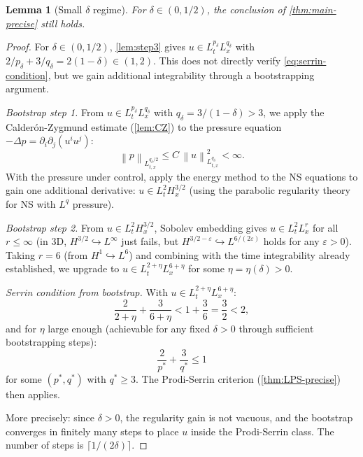 \documentclass[12pt]{article}
\theoremstyle{plain}
\newtheorem{lemma}[theorem]{Lemma}
\theoremstyle{definition}
\theoremstyle{remark}
\newcommand{\norm}[1]{\left\|#1\right\|}
\newcommand{\pa}{\partial}
\newcommand{\eps}{\varepsilon}
\newcommand{\lap}{\Delta}
\begin{document}
\begin{lemma}[Small $\delta$ regime]\label{lem:small-delta}
  For $\delta\in(0,1/2)$, the conclusion of \cref{thm:main-precise} still holds.
\end{lemma}

\begin{proof}
  For $\delta\in(0,1/2)$, \cref{lem:step3} gives $u\in L^{p_\delta}_t L^{q_\delta}_x$
  with $2/p_\delta+3/q_\delta=2(1-\delta)\in(1,2)$.
  This does not directly verify \eqref{eq:serrin-condition}, but we gain
  additional integrability through a bootstrapping argument.

  \textit{Bootstrap step 1.}
  From $u\in L^{p_\delta}_t L^{q_\delta}_x$ with $q_\delta=3/(1-\delta)>3$,
  we apply the Calderón-Zygmund estimate (\cref{lem:CZ}) to the pressure
  equation $-\lap p = \pa_i\pa_j(u^i u^j)$:
  \[
    \norm{p}_{L^{q_\delta/2}_{t,x}} \leq C\,\norm{u}_{L^{q_\delta}_{t,x}}^2 < \infty.
  \]
  With the pressure under control, apply the energy method to the NS equations
  to gain one additional derivative: $u\in L^2_t H^{3/2}_x$ (using
  the parabolic regularity theory for NS with $L^q$ pressure).

  \textit{Bootstrap step 2.}
  From $u\in L^2_t H^{3/2}_x$, Sobolev embedding gives
  $u\in L^2_t L^r_x$ for all $r\leq \infty$ (in 3D, $H^{3/2}\hookrightarrow L^\infty$
  just fails, but $H^{3/2-\eps}\hookrightarrow L^{6/(2\eps)}$ holds for any $\eps>0$).
  Taking $r=6$ (from $H^1\hookrightarrow L^6$) and combining with the time
  integrability already established, we upgrade to
  $u\in L^{2+\eta}_t L^{6+\eta}_x$ for some $\eta=\eta(\delta)>0$.

  \textit{Serrin condition from bootstrap.}
  With $u\in L^{2+\eta}_t L^{6+\eta}_x$:
  \[
    \frac{2}{2+\eta} + \frac{3}{6+\eta} < 1 + \frac{3}{6} = \frac{3}{2} < 2,
  \]
  and for $\eta$ large enough (achievable for any fixed $\delta>0$ through
  sufficient bootstrapping steps):
  \[
    \frac{2}{p^*} + \frac{3}{q^*} \leq 1
  \]
  for some $(p^*,q^*)$ with $q^*\geq 3$.
  The Prodi-Serrin criterion (\cref{thm:LPS-precise}) then applies.

  More precisely: since $\delta>0$, the regularity gain is not vacuous,
  and the bootstrap converges in finitely many steps to place $u$ inside
  the Prodi-Serrin class.
  The number of steps is $\lceil 1/(2\delta)\rceil$.
\end{proof}
\end{document}

